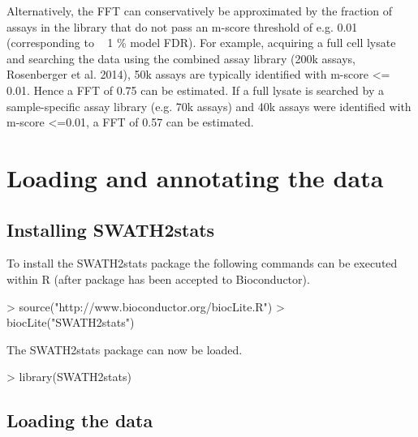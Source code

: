 \documentclass[a4paper]{article}
\begin{document}
Alternatively, the FFT can conservatively be approximated by the fraction of assays in the library that do not pass an m-score threshold of e.g. 0.01 (corresponding to ~ 1 \% model FDR). For example, acquiring a full cell lysate and searching the data using the combined assay library (200k assays, Rosenberger et al. 2014), 50k assays are typically identified with m-score <= 0.01. Hence a FFT of 0.75 can be estimated. If a full lysate is searched by a sample-specific assay library (e.g. 70k assays) and 40k assays were identified with m-score <=0.01, a FFT of 0.57 can be estimated.\\



\section{Loading and annotating the data}
\subsection{Installing SWATH2stats}

To install the SWATH2stats package the following commands can be executed within R (after package has been accepted to Bioconductor).

\begin{Schunk}
\begin{Sinput}
> source("http://www.bioconductor.org/biocLite.R")
> biocLite("SWATH2stats")
\end{Sinput}
\end{Schunk}

The SWATH2stats package can now be loaded.
\begin{Schunk}
\begin{Sinput}
> library(SWATH2stats)
\end{Sinput}
\end{Schunk}

\subsection{Loading the data}
\end{document}

